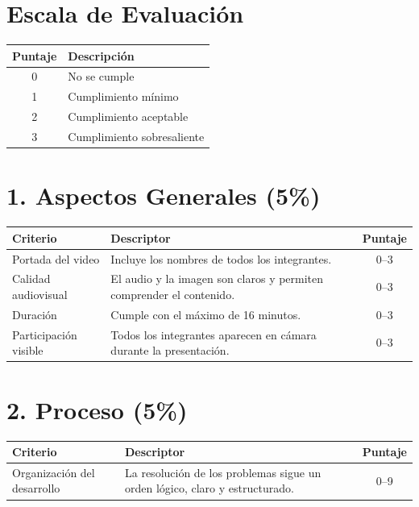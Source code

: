 \documentclass[12pt]{article}
\begin{document}
	\section*{Escala de Evaluación}
	
	\begin{center}
		\begin{tabular}{cl}
			\toprule
			\textbf{Puntaje} & \textbf{Descripción} \\
			\midrule
			0 & No se cumple \\
			1 & Cumplimiento mínimo \\
			2 & Cumplimiento aceptable \\
			3 & Cumplimiento sobresaliente \\
			\bottomrule
		\end{tabular}
	\end{center}
	
	\section*{1. Aspectos Generales (5\%)}
	
	\begin{center}
		\begin{tabular}{p{5cm} p{8cm} c}
			\toprule
			\textbf{Criterio} & \textbf{Descriptor} & \textbf{Puntaje} \\
			\midrule
			Portada del video & Incluye los nombres de todos los integrantes. & 0--3 \\
			Calidad audiovisual & El audio y la imagen son claros y permiten comprender el contenido. & 0--3 \\
			Duración & Cumple con el máximo de 16 minutos. & 0--3 \\
			Participación visible & Todos los integrantes aparecen en cámara durante la presentación. & 0--3 \\
			\bottomrule
		\end{tabular}
	\end{center}
	
	\section*{2. Proceso (5\%)}
	
	\begin{center}
		\begin{tabular}{p{5cm} p{8cm} c}
			\toprule
			\textbf{Criterio} & \textbf{Descriptor} & \textbf{Puntaje} \\
			\midrule
			Organización del desarrollo & La resolución de los problemas sigue un orden lógico, claro y estructurado. & 0--9 \\
			\bottomrule
		\end{tabular}
	\end{center}
	
\end{document}
